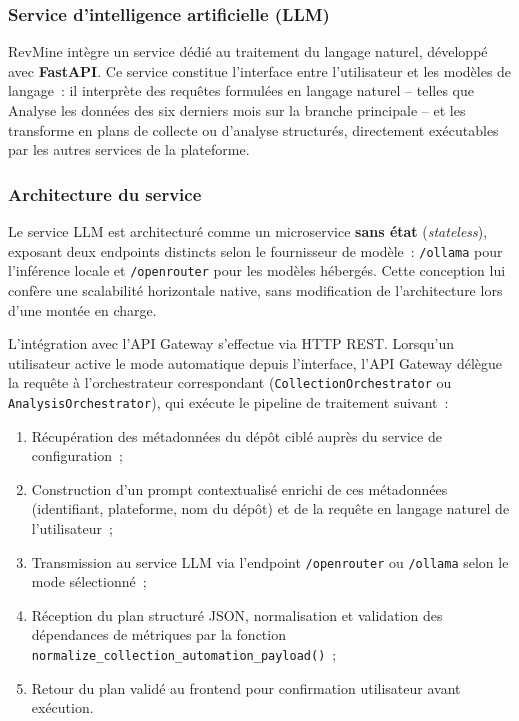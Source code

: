 \subsubsection{Service d'intelligence artificielle (LLM)}
\label{subsec:service-llm}

RevMine intègre un service dédié au traitement du langage naturel, développé avec
\textbf{FastAPI}. Ce service constitue l'interface entre l'utilisateur et les modèles de
langage~: il interprète des requêtes formulées en langage naturel -- telles que \og{}Analyse les
données des six derniers mois sur la branche principale\fg{} -- et les transforme en plans de
collecte ou d'analyse structurés, directement exécutables par les autres services de la
plateforme.

\subsubsection*{Architecture du service}

Le service LLM est architecturé comme un microservice \textbf{sans état} (\textit{stateless}),
exposant deux endpoints distincts selon le fournisseur de modèle~: \texttt{/ollama} pour
l'inférence locale et \texttt{/openrouter} pour les modèles hébergés. Cette conception lui
confère une scalabilité horizontale native, sans modification de l'architecture lors d'une montée
en charge.

L'intégration avec l'API Gateway s'effectue via HTTP REST. Lorsqu'un utilisateur active le mode
automatique depuis l'interface, l'API Gateway délègue la requête à l'orchestrateur correspondant
(\texttt{CollectionOrchestrator} ou \texttt{AnalysisOrchestrator}), qui exécute le pipeline de
traitement suivant~:

\begin{enumerate}
    \item Récupération des métadonnées du dépôt ciblé auprès du service de configuration~;
    \item Construction d'un prompt contextualisé enrichi de ces métadonnées (identifiant,
          plateforme, nom du dépôt) et de la requête en langage naturel de l'utilisateur~;
    \item Transmission au service LLM via l'endpoint \texttt{/openrouter} ou \texttt{/ollama}
          selon le mode sélectionné~;
    \item Réception du plan structuré JSON, normalisation et validation des dépendances de
          métriques par la fonction \texttt{normalize\_collection\_automation\_payload()}~;
    \item Retour du plan validé au frontend pour confirmation utilisateur avant exécution.
\end{enumerate}

